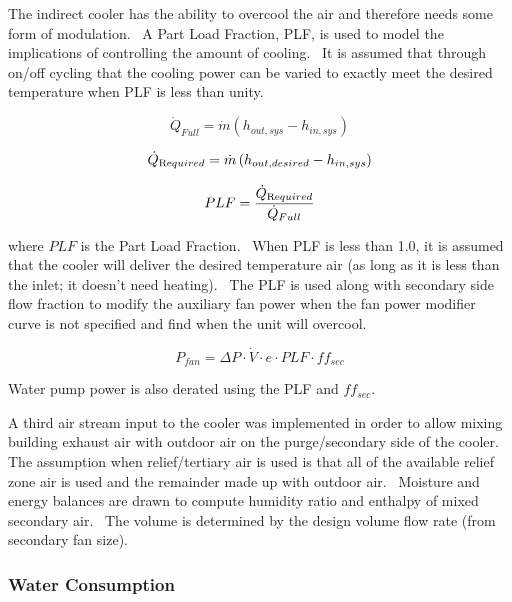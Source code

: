 The indirect cooler has the ability to overcool the air and therefore needs some form of modulation.~ A Part Load Fraction, PLF, is used to model the implications of controlling the amount of cooling.~ It is assumed that through on/off cycling that the cooling power can be varied to exactly meet the desired temperature when PLF is less than unity.

\begin{equation}
{\dot Q_{Full}} = \dot m\left( {{h_{out,sys}} - {h_{in,sys}}} \right)
\end{equation}

\begin{equation}
{\dot Q_{{\mathop{\rm Re}\nolimits} quired}} = \dot m\left( {{h_{out,desired}} - {h_{in,sys}}} \right)
\end{equation}

\begin{equation}
PLF = \frac{{{{\dot Q}_{{\mathop{\rm Re}\nolimits} quired}}}}{{{{\dot Q}_{Full}}}}
\end{equation}

where \(PLF\) is the Part Load Fraction.~ When PLF is less than 1.0, it is assumed that the cooler will deliver the desired temperature air (as long as it is less than the inlet; it doesn't need heating).~ The PLF is used along with secondary side flow fraction to modify the auxiliary fan power when the fan power modifier curve is not specified and find when the unit will overcool.

\begin{equation}
{P_{fan}} = \Delta P\cdot \dot V\cdot e\cdot PLF\cdot ff_{sec}
\end{equation}

Water pump power is also derated using the PLF and \(ff_{sec}\).

A third air stream input to the cooler was implemented in order to allow mixing building exhaust air with outdoor air on the purge/secondary side of the cooler. The assumption when relief/tertiary air is used is that all of the available relief zone air is used and the remainder made up with outdoor air.~ Moisture and energy balances are drawn to compute humidity ratio and enthalpy of mixed secondary air.~ The volume is determined by the design volume flow rate (from secondary fan size).

\subsubsection{Water Consumption}\label{water-consumption}

